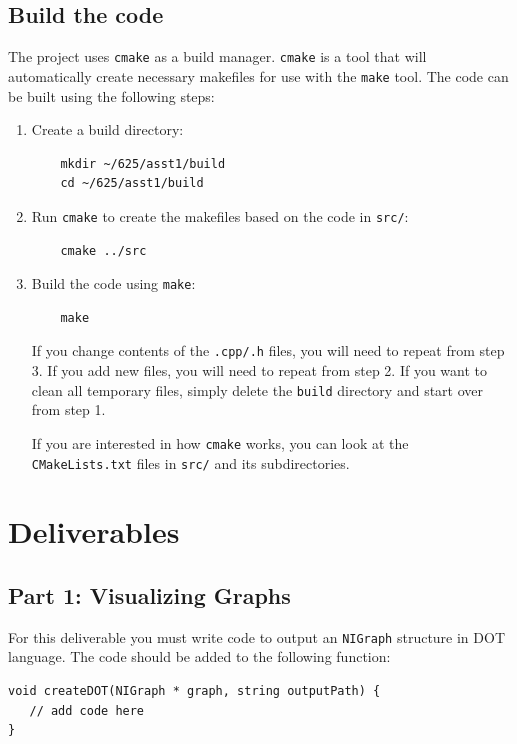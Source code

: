 \subsection{Build the code}
The project uses {\tt cmake} as a build manager.  {\tt cmake} is a tool that will automatically create necessary makefiles for use with the {\tt make} tool.
The code can be built using the following steps:
\begin{enumerate}
	\item Create a build directory:
	\begin{lstlisting}
	mkdir ~/625/asst1/build
	cd ~/625/asst1/build
	\end{lstlisting}
	
	\item Run {\tt cmake} to create the makefiles based on the code in {\tt src/}:
	\begin{lstlisting}
	cmake ../src	
	\end{lstlisting}
		
	\item Build the code using {\tt make}:
	\begin{lstlisting}
	make
	\end{lstlisting}
	
If you change contents of the {\tt .cpp/.h} files, you will need to repeat from step 3.  If you add new files, you will need to repeat from step 2.  If you want to clean all temporary files, simply delete the {\tt build} directory and start over from step 1.
	
If you are interested in how {\tt cmake} works, you can look at the {\tt CMakeLists.txt} files in {\tt src/} and its subdirectories.
	
\end{enumerate}


\section{Deliverables}

\subsection{Part 1: Visualizing Graphs}
\label{sec:del1}

For this deliverable you must write code to output an {\tt NIGraph} structure in DOT language.  The code should be added to the following function:

\begin{lstlisting}
void createDOT(NIGraph * graph, string outputPath) {
   // add code here
}
\end{lstlisting}

